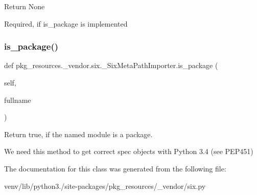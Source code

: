 \begin{DoxyVerb}Return None

Required, if is_package is implemented\end{DoxyVerb}
 \mbox{\label{classpkg__resources_1_1__vendor_1_1six_1_1___six_meta_path_importer_ac8e56aa8545e7ad33bc26aac169c2b10}} 
\subsubsection{\texorpdfstring{is\+\_\+package()}{is\_package()}}
{\footnotesize\ttfamily def pkg\+\_\+resources.\+\_\+vendor.\+six.\+\_\+\+Six\+Meta\+Path\+Importer.\+is\+\_\+package (\begin{DoxyParamCaption}\item[{}]{self,  }\item[{}]{fullname }\end{DoxyParamCaption})}

\begin{DoxyVerb}Return true, if the named module is a package.

We need this method to get correct spec objects with
Python 3.4 (see PEP451)
\end{DoxyVerb}
 

The documentation for this class was generated from the following file\+:\begin{DoxyCompactItemize}
\item 
venv/lib/python3./site-\/packages/pkg\+\_\+resources/\+\_\+vendor/six.\+py\end{DoxyCompactItemize}
